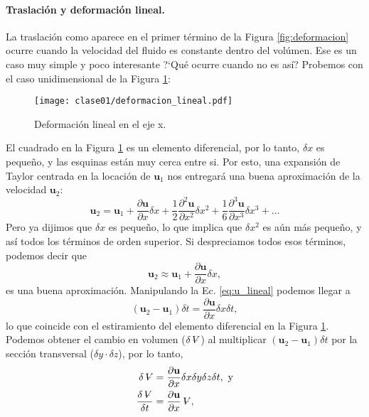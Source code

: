 \paragraph{Traslación y deformación lineal.}
La traslación como aparece en el primer término de la Figura \ref{fig:deformacion} ocurre cuando la velocidad del fluido es constante dentro del volúmen.
Ese es un caso muy simple y poco interesante 
\mbox{?`}Qué ocurre cuando no es así? 
Probemos con el caso unidimensional de la Figura \ref{fig:deformacion_lineal}:
%
\begin{figure}[h!]
\centering
\texttt{[image: clase01/deformacion\_lineal.pdf]}
\caption{Deformación lineal en el eje x.}
\label{fig:deformacion_lineal}
\end{figure}

El cuadrado en la Figura \ref{fig:deformacion_lineal} es un elemento diferencial, por lo tanto, $\delta x$ es pequeño, y las esquinas están muy cerca entre si.
Por esto, una expansión de Taylor centrada en la locación de $\mathbf{u}_1$ nos entregará una buena aproximación de la velocidad $\mathbf{u}_2$:
%
\begin{equation}
\mathbf{u}_2 = \mathbf{u}_1 + \frac{\partial \mathbf{u}}{\partial x}\delta x + \frac{1}{2}\frac{\partial^2 \mathbf{u}}{\partial x^2}\delta x^2 + \frac{1}{6}\frac{\partial^3 \mathbf{u}}{\partial x^3}\delta x^3 + \dots
\end{equation}
%
Pero ya dijimos que $\delta x$ es pequeño, lo que implica que $\delta x^2$ es aún más pequeño, y así todos los términos de orden superior.
Si despreciamos todos esos términos, podemos decir que
%
\begin{equation}\label{eq:u_lineal}
\mathbf{u}_2 \approx \mathbf{u}_1 + \frac{\partial \mathbf{u}}{\partial x}\delta x,
\end{equation}
%
es una buena aproximación.
Manipulando la Ec. \eqref{eq:u_lineal} podemos llegar a
%
\begin{equation}
(\mathbf{u}_2-\mathbf{u}_1)\delta t=\frac{\partial \mathbf{u}}{\partial x}\delta x\delta t,
\end{equation}
%
lo que coincide con el estiramiento del elemento diferencial en la Figura \ref{fig:deformacion_lineal}.
Podemos obtener el cambio en volumen ($\delta \vol$) al multiplicar $(\mathbf{u}_2-\mathbf{u}_1)\delta t$ por la sección transversal ($\delta y\cdot \delta z$), por lo tanto,
%
\begin{align}
\delta \vol &= \frac{\partial \mathbf{u}}{\partial x} \delta x\delta y\delta z\delta t, \text{ y} \nonumber \\
\frac{\delta \vol}{\delta t} &= \frac{\partial \mathbf{u}}{\partial x} \vol,
\end{align}
